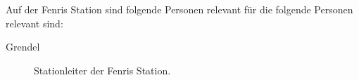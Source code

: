 
Auf der Fenris Station sind folgende Personen relevant für die folgende Personen relevant sind:

\begin{description}
    \item [Grendel] Stationleiter der Fenris Station.
\end{description}

